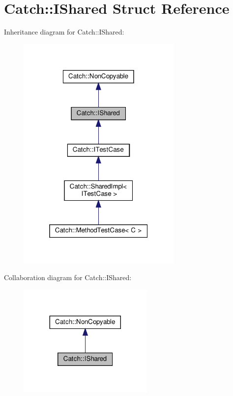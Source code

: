 \hypertarget{structCatch_1_1IShared}{}\section{Catch\+:\+:I\+Shared Struct Reference}
\label{structCatch_1_1IShared}


Inheritance diagram for Catch\+:\+:I\+Shared\+:
\nopagebreak
\begin{figure}[H]
\begin{center}
\leavevmode
\includegraphics[width=229pt]{structCatch_1_1IShared__inherit__graph}
\end{center}
\end{figure}


Collaboration diagram for Catch\+:\+:I\+Shared\+:
\nopagebreak
\begin{figure}[H]
\begin{center}
\leavevmode
\includegraphics[width=188pt]{structCatch_1_1IShared__coll__graph}
\end{center}
\end{figure}
